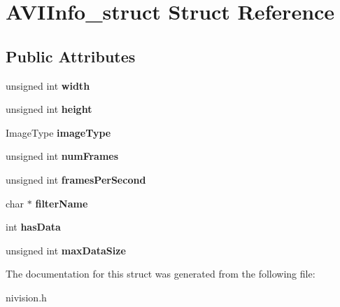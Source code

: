 \hypertarget{structAVIInfo__struct}{\section{\-A\-V\-I\-Info\-\_\-struct \-Struct \-Reference}
\label{structAVIInfo__struct}
}
\subsection*{\-Public \-Attributes}
\begin{DoxyCompactItemize}
\item 
\hypertarget{structAVIInfo__struct_a5930ecb40bba7452b33ee552e3230e31}{unsigned int {\bfseries width}}\label{structAVIInfo__struct_a5930ecb40bba7452b33ee552e3230e31}

\item 
\hypertarget{structAVIInfo__struct_a3a123b86f762fed55cc1793b09a302a5}{unsigned int {\bfseries height}}\label{structAVIInfo__struct_a3a123b86f762fed55cc1793b09a302a5}

\item 
\hypertarget{structAVIInfo__struct_a9caab71ecd15bf27bd517f3ebae69591}{\-Image\-Type {\bfseries image\-Type}}\label{structAVIInfo__struct_a9caab71ecd15bf27bd517f3ebae69591}

\item 
\hypertarget{structAVIInfo__struct_a204e45ff7d7833274a395aa580ba8c4f}{unsigned int {\bfseries num\-Frames}}\label{structAVIInfo__struct_a204e45ff7d7833274a395aa580ba8c4f}

\item 
\hypertarget{structAVIInfo__struct_a69c31dd80c11068e7b18ec1fb63d57c4}{unsigned int {\bfseries frames\-Per\-Second}}\label{structAVIInfo__struct_a69c31dd80c11068e7b18ec1fb63d57c4}

\item 
\hypertarget{structAVIInfo__struct_a44fdba7cf78d56e46ab52c6ed3b937ca}{char $\ast$ {\bfseries filter\-Name}}\label{structAVIInfo__struct_a44fdba7cf78d56e46ab52c6ed3b937ca}

\item 
\hypertarget{structAVIInfo__struct_a3ad06da8bb76683b47edeff6ac8b65f3}{int {\bfseries has\-Data}}\label{structAVIInfo__struct_a3ad06da8bb76683b47edeff6ac8b65f3}

\item 
\hypertarget{structAVIInfo__struct_a25df01a231bc516f0e75aed4fba04695}{unsigned int {\bfseries max\-Data\-Size}}\label{structAVIInfo__struct_a25df01a231bc516f0e75aed4fba04695}

\end{DoxyCompactItemize}


\-The documentation for this struct was generated from the following file\-:\begin{DoxyCompactItemize}
\item 
nivision.\-h\end{DoxyCompactItemize}
